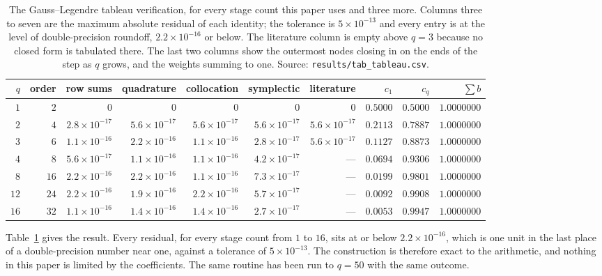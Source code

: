 \documentclass[11pt,a4paper]{article}
\begin{document}
\begin{table}[tbp]
  \centering
  \caption{The Gauss--Legendre tableau verification, for every stage count this
  paper uses and three more. Columns three to seven are the maximum absolute
  residual of each identity; the tolerance is $5 \times 10^{-13}$ and every
  entry is at the level of double-precision roundoff, $2.2 \times 10^{-16}$ or
  below. The literature column is empty above $q = 3$ because no closed form is
  tabulated there. The last two columns show the outermost nodes closing in on
  the ends of the step as $q$ grows, and the weights summing to one.
  Source: \texttt{results/tab\_tableau.csv}.}
  \label{tab:tableau}
  \footnotesize
  \setlength{\tabcolsep}{3pt}
  \begin{tabular}{rrrrrrrrrr}
    \toprule
    $q$ & order & row sums & quadrature & collocation & symplectic & literature
        & $c_1$ & $c_q$ & $\sum b$ \\
    \midrule
    $1$  & $2$  & $0$          & $0$          & $0$          & $0$          & $0$          & $0.5000$ & $0.5000$ & $1.0000000$ \\
    $2$  & $4$  & $2.8\times 10^{-17}$ & $5.6\times 10^{-17}$ & $5.6\times 10^{-17}$ & $5.6\times 10^{-17}$ & $5.6\times 10^{-17}$ & $0.2113$ & $0.7887$ & $1.0000000$ \\
    $3$  & $6$  & $1.1\times 10^{-16}$ & $2.2\times 10^{-16}$ & $1.1\times 10^{-16}$ & $2.8\times 10^{-17}$ & $5.6\times 10^{-17}$ & $0.1127$ & $0.8873$ & $1.0000000$ \\
    $4$  & $8$  & $5.6\times 10^{-17}$ & $1.1\times 10^{-16}$ & $1.1\times 10^{-16}$ & $4.2\times 10^{-17}$ & ---          & $0.0694$ & $0.9306$ & $1.0000000$ \\
    $8$  & $16$ & $2.2\times 10^{-16}$ & $2.2\times 10^{-16}$ & $1.1\times 10^{-16}$ & $7.3\times 10^{-17}$ & ---          & $0.0199$ & $0.9801$ & $1.0000000$ \\
    $12$ & $24$ & $2.2\times 10^{-16}$ & $1.9\times 10^{-16}$ & $2.2\times 10^{-16}$ & $5.7\times 10^{-17}$ & ---          & $0.0092$ & $0.9908$ & $1.0000000$ \\
    $16$ & $32$ & $1.1\times 10^{-16}$ & $1.4\times 10^{-16}$ & $1.4\times 10^{-16}$ & $2.7\times 10^{-17}$ & ---          & $0.0053$ & $0.9947$ & $1.0000000$ \\
    \bottomrule
  \end{tabular}
\end{table}

Table~\ref{tab:tableau} gives the result. Every residual, for every stage count
from $1$ to $16$, sits at or below $2.2 \times 10^{-16}$, which is one unit in
the last place of a double-precision number near one, against a tolerance of
$5 \times 10^{-13}$. The construction is therefore exact to the arithmetic, and
nothing in this paper is limited by the coefficients. The same routine has been
run to $q = 50$ with the same outcome.
\end{document}
